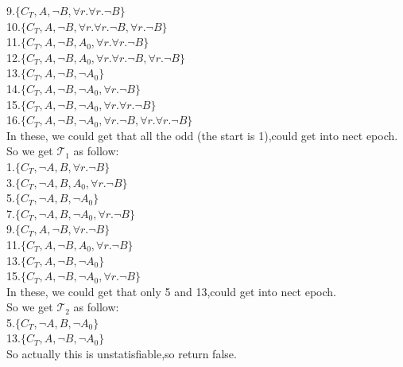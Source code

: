 \documentclass{article}
\begin{document}
    9.$\{C_T, A,\neg B, \forall r.\forall r.\neg B\}$\\
    10.$\{C_T, A,\neg B, \forall r.\forall r.\neg B, \forall r.\neg B\}$\\
    11.$\{C_T, A,\neg B, A_0, \forall r.\forall r.\neg B\}$\\
    12.$\{C_T, A,\neg B, A_0, \forall r.\forall r.\neg B,\forall r.\neg B\}$\\
    13.$\{C_T, A,\neg B, \neg A_0\}$\\
    14.$\{C_T, A,\neg B, \neg A_0, \forall r.\neg B\}$\\
    15.$\{C_T, A,\neg B, \neg A_0, \forall r.\forall r.\neg B\}$\\
    16.$\{C_T, A,\neg B, \neg A_0, \forall r.\neg B,\forall r.\forall r.\neg B\}$\\
    In these, we could get that all the odd (the start is 1),could get into nect epoch.\\
    So we get $\mathcal{T}_1$ as follow:\\
    1.$\{C_T,\neg A, B, \forall r.\neg B\}$\\
    3.$\{C_T,\neg A, B, A_0, \forall r.\neg B\}$\\
    5.$\{C_T,\neg A, B, \neg A_0\}$\\
    7.$\{C_T,\neg A, B, \neg A_0, \forall r.\neg B\}$\\
    9.$\{C_T, A,\neg B, \forall r.\neg B\}$\\
    11.$\{C_T, A,\neg B, A_0, \forall r.\neg B\}$\\
    13.$\{C_T, A,\neg B, \neg A_0\}$\\
    15.$\{C_T, A,\neg B, \neg A_0, \forall r.\neg B\}$\\
    In these, we could get that only 5 and 13,could get into nect epoch.\\
    So we get $\mathcal{T}_2$ as follow:\\
    5.$\{C_T,\neg A, B, \neg A_0\}$\\
    13.$\{C_T, A,\neg B, \neg A_0\}$\\
    So actually this is unstatisfiable,so return false.
\end{document}
